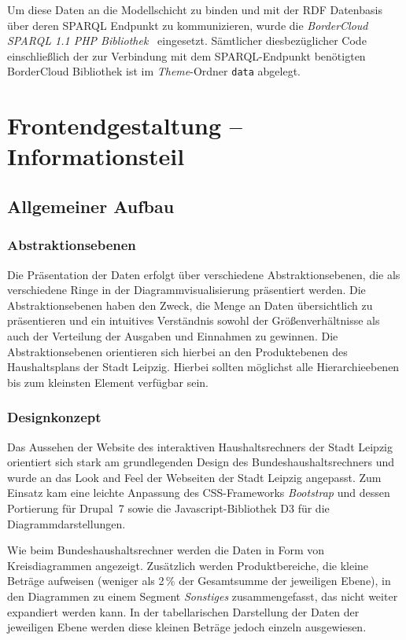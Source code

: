 \documentclass[a4paper,11pt,twoside]{article}
\begin{document}
Um diese Daten an die Modellschicht zu binden und mit der RDF Datenbasis über
deren SPARQL Endpunkt zu kommunizieren, wurde die \emph{BorderCloud SPARQL 1.1
  PHP Bibliothek}~\cite{BorderCloud} eingesetzt.  Sämtlicher diesbezüglicher
Code einschließlich der zur Verbindung mit dem SPARQL-Endpunkt benötigten
BorderCloud Bibliothek ist im \emph{Theme}-Ordner \texttt{data} abgelegt.

\section{Frontendgestaltung -- Informationsteil}

\subsection{Allgemeiner Aufbau}

\subsubsection*{Abstraktionsebenen}

Die Präsentation der Daten erfolgt über verschiedene Abstraktionsebenen, die
als verschiedene Ringe in der Diagrammvisualisierung präsentiert werden. Die
Abstraktionsebenen haben den Zweck, die Menge an Daten übersichtlich zu
präsentieren und ein intuitives Verständnis sowohl der Größenverhältnisse als
auch der Verteilung der Ausgaben und Einnahmen zu gewinnen. Die
Abstraktionsebenen orientieren sich hierbei an den Produktebenen des
Haushaltsplans der Stadt Leipzig. Hierbei sollten möglichst alle
Hierarchieebenen bis zum kleinsten Element verfügbar sein.

\subsubsection*{Designkonzept}
Das Aussehen der Website des interaktiven Haushaltsrechners der Stadt Leipzig
orientiert sich stark am grundlegenden Design des Bundeshaushaltsrechners und
wurde an das Look and Feel der Webseiten der Stadt Leipzig angepasst.  Zum
Einsatz kam eine leichte Anpassung des CSS-Frameworks \textit{Bootstrap}
\cite{Bootstrap} und dessen Portierung für Drupal~7 sowie die
Javascript-Bibliothek D3 für die Diagrammdarstellungen.

Wie beim Bundeshaushaltsrechner werden die Daten in Form von Kreisdiagrammen
angezeigt.  Zusätzlich werden Produktbereiche, die kleine Beträge aufweisen
(weniger als 2\,\% der Gesamtsumme der jeweiligen Ebene), in den Diagrammen zu
einem Segment \textit{Sonstiges} zusammengefasst, das nicht weiter expandiert
werden kann.  In der tabellarischen Darstellung der Daten der jeweiligen Ebene
werden diese kleinen Beträge jedoch einzeln ausgewiesen.
\end{document}
